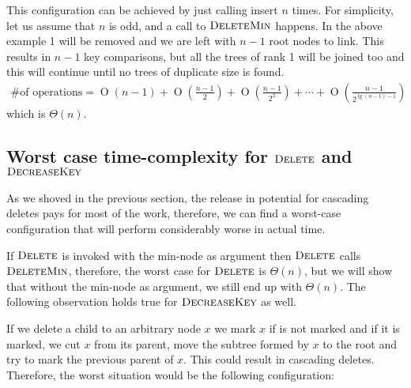 \documentclass[oneside,11pt,openright]{report}
\newcommand{\BigO}[1]{\ensuremath{\operatorname{O}\left(#1\right)}}
\newcommand{\BigT}[1]{\ensuremath{\Theta\left(#1\right)}}
\newcommand{\DeleteMin}{\textsc{DeleteMin}}
\newcommand{\DecreaseKey}{\textsc{DecreaseKey}}
\newcommand{\Delete}{\textsc{Delete}}
\begin{document}
This configuration can be achieved by just calling insert $n$ times. For simplicity, let us assume that $n$ is odd, and a call to $\DeleteMin$ happens. In the above example 1 will be removed and we are left with $n-1$ root nodes to link. This results in $n-1$ key comparisons, but all the trees of rank 1 will be joined too and this will continue until no trees of duplicate size is found.
\begin{align*}
  \text{\# of operations} = \BigO{n-1} + \BigO{\frac{n-1}{2}} + \BigO{\frac{n-1}{2^2}} + \cdots + \BigO{\frac{n-1}{2^{\lg (n-1)-1}}}
\end{align*}
which is $\BigT{n}$.

\subsection{Worst case time-complexity for $\Delete$ and $\DecreaseKey$}

As we shoved in the previous section, the release in potential for cascading deletes pays for most of the work, therefore, we can find a worst-case configuration that will perform considerably worse in actual time.

If $\Delete$ is invoked with the min-node as argument then $\Delete$ calls $\DeleteMin$, therefore, the worst case for $\Delete$ is $\BigT{n}$, but we will show that without the min-node as argument, we still end up with $\BigT{n}$. The following observation holds true for $\DecreaseKey$ as well.

If we delete a child to an arbitrary node $x$ we mark $x$ if is not marked and if it is marked, we cut $x$ from its parent, move the subtree formed by $x$ to the root and try to mark the previous parent of $x$. This could result in cascading deletes. Therefore, the worst situation would be the following configuration:
\begin{center}
\end{center}
\end{document}

